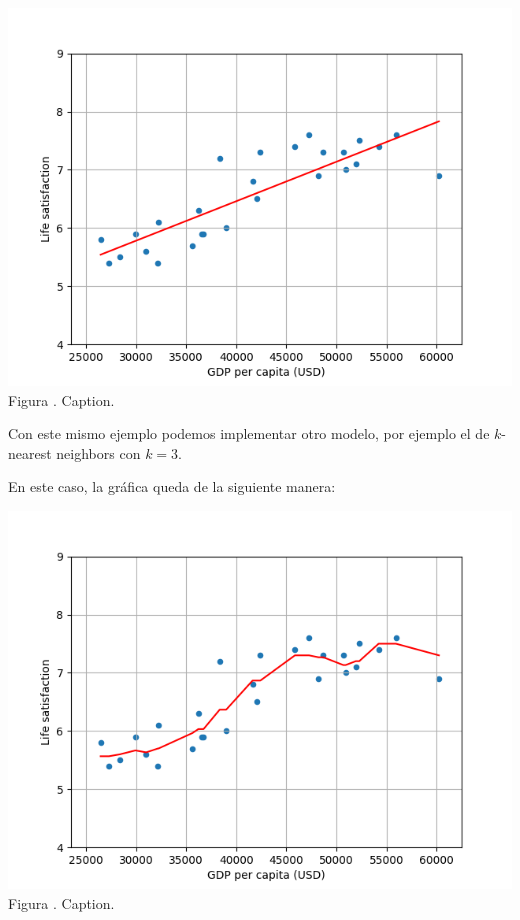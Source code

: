 \documentclass[12pt]{report}
\theoremstyle{largebreak}
\newcounter{figcount}
\begin{document}
\begin{sol}
        \begin{minipage}{\textwidth}
            \begin{center}
                \includegraphics[scale=0.7]{images/plot_2.png}\\
                Figura \thefigcount. Caption.
            \end{center}
        \end{minipage}

        Con este mismo ejemplo podemos implementar otro modelo, por ejemplo el de $k$-nearest neighbors con $k=3$.

        

        En este caso, la gráfica queda de la siguiente manera:

        \begin{minipage}{\textwidth}
            \begin{center}
                \includegraphics[scale=0.7]{images/plot_3.png}\\
                Figura \thefigcount. Caption.
            \end{center}
        \end{minipage}


\end{sol}
\end{document}
